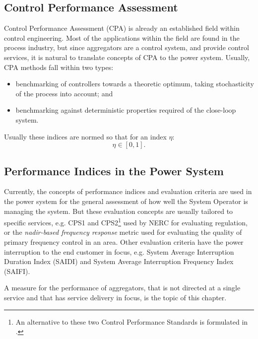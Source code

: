 \subsection{Control Performance Assessment}
Control Performance Assessment (CPA) is already an established field within control engineering. Most of the applications within the field are found in the process industry, but since aggregators are a control system, and provide control services, it is natural to translate concepts of CPA to the power system. Usually, CPA methods fall within two types:
\begin{itemize}
	\item benchmarking of controllers towards a theoretic optimum, taking stochasticity of the process into account; and
	\item benchmarking against deterministic properties required of the close-loop system.
\end{itemize}

Usually these indices are normed so that for an index $\eta$:
\begin{equation}
	\eta \in [0,1].
\end{equation}

\subsection{Performance Indices in the Power System}
Currently, the concepts of performance indices and evaluation criteria are used in the power system for the general assessment of how well the System Operator is managing the system. But these evaluation concepts are usually tailored to specific services, e.g. CPS1 and CPS2\footnote{An alternative to these two Control Performance Standards is formulated in \cite{gross2001analysis}.} used by NERC for evaluating regulation, or the \emph{nadir-based frequency response} metric used for evaluating the quality of primary frequency control in an area. Other evaluation criteria have the power interruption to the end customer in focus, e.g. System Average Interruption Duration Index (SAIDI) and System Average Interruption Frequency Index (SAIFI). 

A measure for the performance of aggregators, that is not directed at a single service and that has service delivery in focus, is the topic of this chapter.

